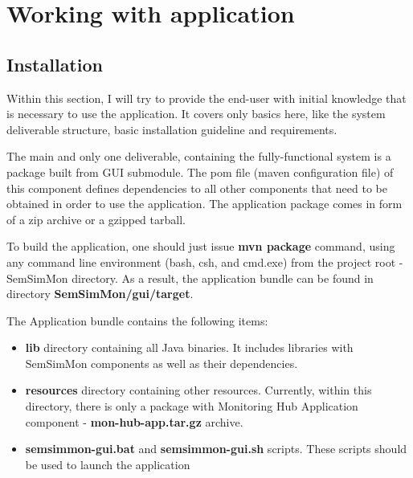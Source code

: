 %
\section{Working with application}

\subsection{Installation}
\label{sec:ch7_working_with}

Within this section, I will try to provide the end-user with initial knowledge that is necessary to use the application. It covers only basics here, like the system deliverable structure, basic installation guideline and requirements.

The main and only one deliverable, containing the fully-functional system is a package built from GUI submodule. The pom file (maven configuration file) of this component defines dependencies to all other components that need to be obtained in order to use the application. The application package comes in  form of a zip archive or a gzipped tarball.

To build the application, one should just issue {\bf mvn package} command, using any command line environment (bash, csh, and cmd.exe) from the project root - SemSimMon directory. As a result, the application bundle can be found in directory {\bf SemSimMon/gui/target}.

The Application bundle contains the following items:

\begin{itemize}

\item {\bf lib} directory containing all Java binaries. It includes libraries with SemSimMon components as well as their dependencies.

\item {\bf resources} directory containing other resources. Currently, within this directory, there is only a package with Monitoring Hub Application component - {\bf mon-hub-app.tar.gz} archive.

\item {\bf semsimmon-gui.bat} and {\bf semsimmon-gui.sh} scripts. These scripts should be used to launch the application 

\end{itemize} 

